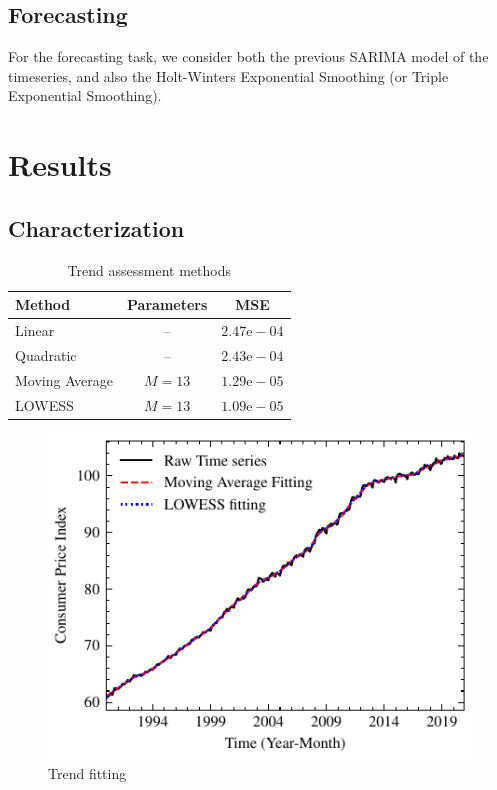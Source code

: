 \documentclass[conference]{IEEEtran}
\begin{document}
\subsection{Forecasting}
For the forecasting task, we consider both the previous SARIMA model of the timeseries, and also the Holt-Winters Exponential Smoothing (or Triple Exponential Smoothing).

\section{Results}
\subsection{Characterization}\label{sec:characterization}

\begin{table}[btp]
    \caption{Trend assessment methods}
    \centering
    \begin{tabular}{l|c|c}
         Method & Parameters & MSE \\
         \hline
         Linear & -- &  $2.47\text{e}-04$ \\
         Quadratic & -- & $2.43\text{e}-04$ \\
         Moving Average & $M=13$ & $1.29\text{e}-05$ \\
         LOWESS & $M=13$ & \cellcolor{green!25}$1.09\text{e}-05$ \\
    \end{tabular}
    \label{tab:trend}
\end{table}

\begin{figure}[hbtp]
    \centering
    \includegraphics{../figs/trend.pdf}
    \caption{Trend fitting}
    \label{fig:trend}
\end{figure}
\end{document}
